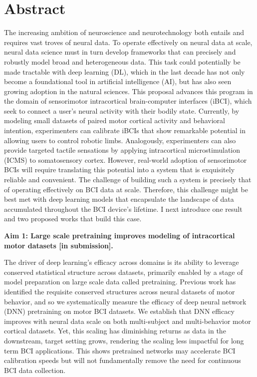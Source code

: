 \documentclass[12pt,oneside]{report}
\begin{document}
\section*{Abstract}
The increasing ambition of neuroscience and neurotechnology both entails and requires vast troves of neural data. To operate effectively on neural data at scale, neural data science must in turn develop frameworks that can precisely and robustly model broad and heterogeneous data. This task could potentially be made tractable with deep learning (DL), which in the last decade has not only become a foundational tool in artificial intelligence (AI), but has also seen growing adoption in the natural sciences. This proposal advances this program in the domain of sensorimotor intracortical brain-computer interfaces (iBCI), which seek to connect a user’s neural activity with their bodily state. Currently, by modeling small datasets of paired motor cortical activity and behavioral intention, experimenters can calibrate iBCIs that show remarkable potential in allowing users to control robotic limbs. Analogously, experimenters can also provide targeted tactile sensations by applying intracortical microstimulation (ICMS) to somatosensory cortex. However, real-world adoption of sensorimotor BCIs will require translating this potential into a system that is exquisitely reliable and convenient.
The challenge of building such a system is precisely that of operating effectively on BCI data at scale.
Therefore, this challenge might be best met with deep learning models that encapsulate the landscape of data accumulated throughout the BCI device's lifetime.
I next introduce one result and two proposed works that build this case.

\textbf{Aim 1: Large scale pretraining improves modeling of intracortical motor datasets [in submission].}

The driver of deep learning’s efficacy across domains is its ability to leverage conserved statistical structure across datasets, primarily enabled by a stage of model preparation on large scale data called pretraining. Previous work has identified the requisite conserved structures across neural datasets of motor behavior, and so we systematically measure the efficacy of deep neural network (DNN) pretraining on motor BCI datasets. We establish that DNN efficacy improves with neural data scale on both multi-subject and multi-behavior motor cortical datasets. Yet, this scaling has diminishing returns as data in the downstream, target setting grows, rendering the scaling less impactful for long term BCI applications. This shows pretrained networks may accelerate BCI calibration speeds but will not fundamentally remove the need for continuous BCI data collection.
\end{document}
